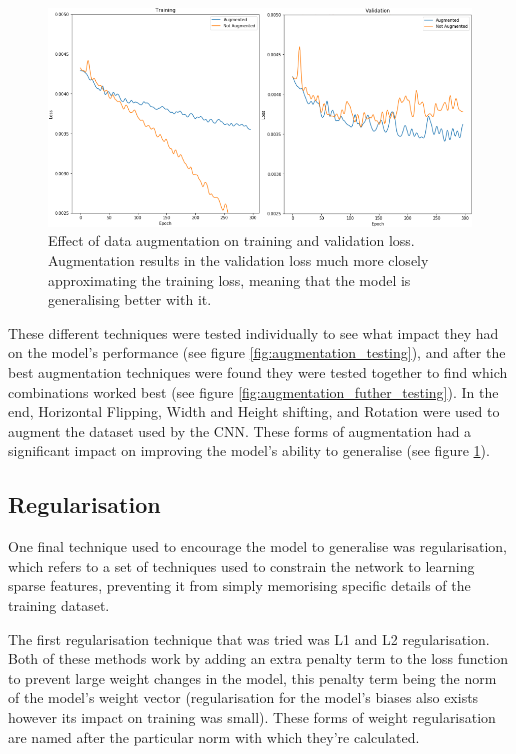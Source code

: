 \documentclass{l4proj}
\begin{document}
\begin{figure}[H]
    \centering
    \includegraphics[width=0.9\linewidth]{images/Augmentation.PNG}    

    \caption{Effect of data augmentation on training and validation loss. Augmentation results in the validation loss much more closely approximating the training loss, meaning that the model is generalising better with it.}

    \label{fig:augmentation} 
\end{figure}

These different techniques were tested individually to see what impact they had on the model's performance (see figure \ref{fig:augmentation_testing}), and after the best augmentation techniques were found they were tested together to find which combinations worked best (see figure \ref{fig:augmentation_futher_testing}). In the end, Horizontal Flipping, Width and Height shifting, and Rotation were used to augment the dataset used by the CNN. These forms of augmentation had a significant impact on improving the model's ability to generalise (see figure \ref{fig:augmentation}).

\subsection{Regularisation}
One final technique used to encourage the model to generalise was regularisation, which refers to a set of techniques used to constrain the network to learning sparse features, preventing it from simply memorising specific details of the training dataset. 

The first regularisation technique that was tried was L1 and L2 regularisation. Both of these methods work by adding an extra penalty term to the loss function to prevent large weight changes in the model, this penalty term being the norm of the model's weight vector (regularisation for the model's biases also exists however its impact on training was small). These forms of weight regularisation are named after the particular norm with which they're calculated. 
\end{document}

